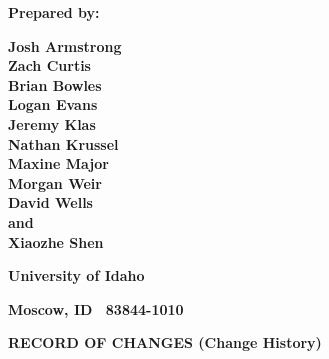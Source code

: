 \documentclass[twoside,letterpaper]{article}
\begin{document}
\bigskip

{\centering{}\bfseries\color{black}
Prepared by:
\par}

{\centering{}\bfseries\color{black}
Josh Armstrong
\\Zach Curtis
\\Brian Bowles
\\Logan Evans
\\Jeremy Klas
\\Nathan Krussel
\\Maxine Major
\\Morgan Weir
\\David Wells
\\and
\\Xiaozhe Shen
\par}

{\centering{}\bfseries\color{black}
University of Idaho
\par}

{\centering{}\bfseries\color{black}
Moscow, ID \ 83844-1010
\par}











{\centering{}\bfseries\color{black}
RECORD OF CHANGES (Change History)
\par}
\end{document}
